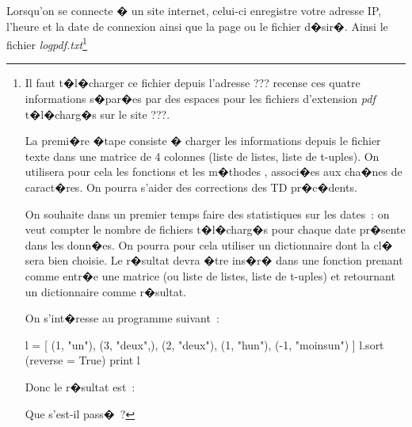 %

\ifx\ifnotellipse\undefined
\newcommand{\ifnotellipse}[1]{}
\fi


\exosubject{}
\begin{xexercicenot}\label{td_note_label81}

Lorsqu'on se connecte � un site internet, celui-ci enregistre votre adresse IP, l'heure et la date de connexion ainsi que la page ou le fichier d�sir�. Ainsi le fichier \textit{logpdf.txt}\footnote{Il faut t�l�charger ce fichier depuis l'adresse ??? recense ces quatre informations s�par�es par des espaces pour les fichiers d'extension \textit{pdf} t�l�charg�s sur le site ???.

\exequest La premi�re �tape consiste � charger les informations depuis le fichier texte dans une matrice de 4 colonnes (liste de listes, liste de t-uples). On utilisera pour cela les fonctions  et les m�thodes ,  associ�es aux cha�nes de caract�res. On pourra s'aider des corrections des TD pr�c�dents.\ifnotellipse{ (2~points)}

\exequest On souhaite dans un premier temps faire des statistiques sur les dates~: on veut compter le nombre de fichiers t�l�charg�s pour chaque date pr�sente dans les donn�es. On pourra pour cela utiliser un dictionnaire dont la cl� sera bien choisie. Le r�sultat devra �tre ins�r� dans une fonction prenant comme entr�e une matrice (ou liste de listes, liste de t-uples) et retournant un dictionnaire comme r�sultat.\ifnotellipse{ (4~points)}

\exequest On s'int�resse au programme suivant~: 
%
\begin{verbatimx}
l = [ (1, "un"), (3, "deux",), (2, "deux"), (1, "hun"), (-1, "moinsun") ]
l.sort (reverse = True)
print l
\end{verbatimx}
%
 Donc le r�sultat est~: 
%
\begin{verbatimx}
\end{verbatimx}
%
 Que s'est-il pass�~?\ifnotellipse{ (2~points)}

}
\end{xexercicenot}
